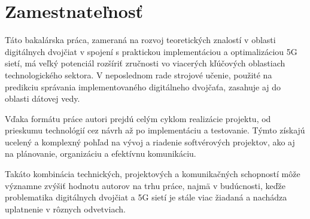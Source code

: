 \section{Zamestnateľnosť}
\par{
Táto bakalárska práca, zameraná na rozvoj teoretických znalostí v oblasti digitálnych dvojčiat v spojení s praktickou implementáciou a optimalizáciou 5G sietí, má veľký potenciál rozšíriť zručnosti vo viacerých kľúčových oblastiach technologického sektora. V neposlednom rade strojové učenie, použité na predikciu správania implementovaného digitálneho dvojčaťa, zasahuje aj do oblasti dátovej vedy.

Vďaka formátu práce autori prejdú celým cyklom realizácie projektu, od prieskumu technológií cez návrh až po implementáciu a testovanie. Týmto získajú ucelený a komplexný pohľad na vývoj a riadenie softvérových projektov, ako aj na plánovanie, organizáciu a efektívnu komunikáciu.

Takáto kombinácia technických, projektových a komunikačných schopností môže významne zvýšiť hodnotu autorov na trhu práce, najmä v budúcnosti, keďže problematika digitálnych dvojčiat a 5G sietí je stále viac žiadaná a nachádza uplatnenie v rôznych odvetviach.
}
